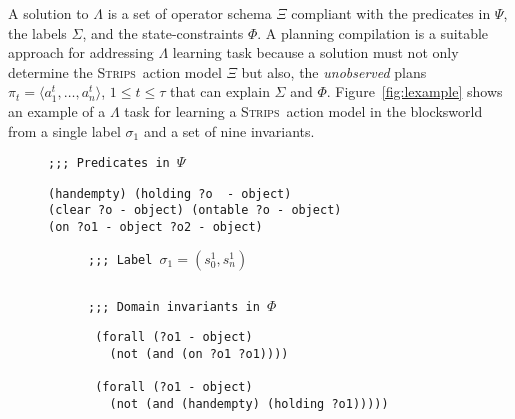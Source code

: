 \documentclass{article}
\newcommand{\tup}[1]{{\langle #1 \rangle}}
\newcommand{\strips}{\textsc{Strips}}     %
\begin{document}
A solution to $\Lambda$ is a set of operator schema $\Xi$ compliant with the predicates in $\Psi$, the labels $\Sigma$, and the state-constraints $\Phi$. A planning compilation is a suitable approach for addressing $\Lambda$ learning task because a solution must not only determine the \strips\ action model $\Xi$ but also, the {\em unobserved} plans $\pi_t=\tup{a_1^t, \ldots, a_n^t}$, {\tt\small $1\leq t\leq \tau$} that can explain $\Sigma$ and $\Phi$. Figure~\ref{fig:lexample} shows an example of a $\Lambda$ task for learning a \strips\ action model in the blocksworld from a single label $\sigma_1$ and a set of nine invariants.

\begin{figure}
{\footnotesize\tt ;;; Predicates in $\Psi$}
\begin{scriptsize}
\begin{verbatim}
(handempty) (holding ?o  - object)
(clear ?o - object) (ontable ?o - object)
(on ?o1 - object ?o2 - object)
\end{verbatim}
\end{scriptsize}
\vspace{0.2cm}
\begin{subfigure}{.6\textwidth}
{\footnotesize\tt ;;; Label $\sigma_1=(s_0^1,s_{n}^1)$}
\begin{lstlisting}[mathescape]
\end{lstlisting}
\vspace{-0.2cm}
\end{subfigure}%
\vspace{0.6cm}
\begin{subfigure}{.6\textwidth}
{\footnotesize\tt ;;; Domain invariants in $\Phi$}
\begin{scriptsize}
\begin{verbatim}
 (forall (?o1 - object)
   (not (and (on ?o1 ?o1))))

 (forall (?o1 - object)
   (not (and (handempty) (holding ?o1)))))


\end{verbatim}
\end{scriptsize}
\end{subfigure}
\end{figure}
\end{document}
